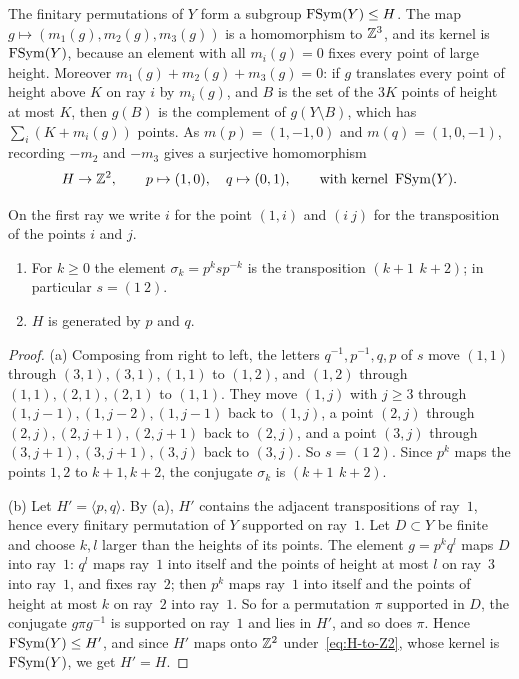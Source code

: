 The finitary permutations of $Y$ form a subgroup $\operatorname{FSym}(Y)\le H$. The map $g\mapsto(m_1(g),m_2(g),m_3(g))$ is a homomorphism to $\mathbb Z^3$,
and its kernel is $\operatorname{FSym}(Y)$, because an element with all $m_i(g)=0$ fixes every point of large height. Moreover
$m_1(g)+m_2(g)+m_3(g)=0$: if $g$ translates every point of height above $K$ on ray $i$ by $m_i(g)$, and $B$ is the set of the $3K$ points
of height at most $K$, then $g(B)$ is the complement of $g(Y\setminus B)$, which has $\sum_i(K+m_i(g))$ points. As $m(p)=(1,-1,0)$ and
$m(q)=(1,0,-1)$, recording $-m_2$ and $-m_3$ gives a surjective homomorphism
\begin{equation}\label{eq:H-to-Z2}
H\to\mathbb Z^2,\qquad p\mapsto(1,0),\quad q\mapsto(0,1),\qquad\text{with kernel }\operatorname{FSym}(Y).
\end{equation}

On the first ray we write $i$ for the point $(1,i)$ and $(i\ j)$ for the transposition of the points $i$ and $j$.

\begin{lemma}[Generators of $H$]\label{group:gen}
\leavevmode
\begin{enumerate}[label=(\alph*),itemsep=1pt]
\item For $k\ge0$ the element $\sigma_k=p^ksp^{-k}$ is the transposition $(k{+}1\ \,k{+}2)$; in particular $s=(1\ 2)$.
\item $H$ is generated by $p$ and $q$.
\end{enumerate}
\end{lemma}

\begin{proof}
(a) Composing from right to left, the letters $q^{-1},p^{-1},q,p$ of $s$ move $(1,1)$ through $(3,1),(3,1),(1,1)$ to $(1,2)$, and $(1,2)$
through $(1,1),(2,1),(2,1)$ to $(1,1)$. They move $(1,j)$ with $j\ge3$ through $(1,j-1),(1,j-2),(1,j-1)$ back to $(1,j)$, a point $(2,j)$
through $(2,j),(2,j+1),(2,j+1)$ back to $(2,j)$, and a point $(3,j)$ through $(3,j+1),(3,j+1),(3,j)$ back to $(3,j)$. So $s=(1\ 2)$. Since
$p^k$ maps the points $1,2$ to $k+1,k+2$, the conjugate $\sigma_k$ is $(k{+}1\ \,k{+}2)$.

(b) Let $H'=\langle p,q\rangle$. By (a), $H'$ contains the adjacent transpositions of ray~$1$, hence every finitary permutation of $Y$ supported
on ray~$1$. Let $D\subset Y$ be finite and choose $k,l$ larger than the heights of its points. The element $g=p^kq^l$ maps $D$ into ray~$1$:
$q^l$ maps ray~$1$ into itself and the points of height at most $l$ on ray~$3$ into ray~$1$, and fixes ray~$2$; then $p^k$ maps ray~$1$
into itself and the points of height at most $k$ on ray~$2$ into ray~$1$. So for a permutation $\pi$ supported in $D$, the conjugate
$g\pi g^{-1}$ is supported on ray~$1$ and lies in $H'$, and so does $\pi$. Hence $\operatorname{FSym}(Y)\le H'$, and since $H'$ maps onto $\mathbb Z^2$
under~\eqref{eq:H-to-Z2}, whose kernel is $\operatorname{FSym}(Y)$, we get $H'=H$.
\end{proof}

